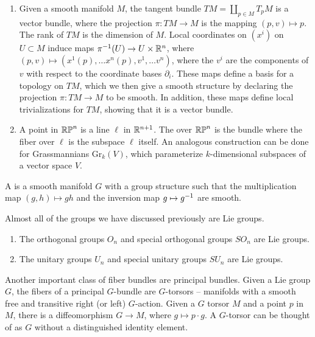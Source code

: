 \begin{exmp} \enumbreak
\begin{enumerate}
  \item Given a smooth manifold $M$, the tangent bundle $TM = \coprod_{p \in M} T_pM$
  is a vector bundle, where the projection $\pi : TM \to M$ is the mapping
  $(p,v) \mapsto p$. The rank of $TM$ is the dimension of $M$.
  Local coordinates on $(x^i)$ on $U \subset M$ induce maps
  $\pi^{-1}(U) \to U \times \mathbb{R}^n$, where
  $(p,v) \mapsto (x^1(p), \ldots x^n(p), v^1, \ldots v^n)$, where the $v^i$ are
  the components of $v$ with respect to the coordinate bases $\partial_i$.
  These maps define a basis for a topology on $TM$, which we then give
  a smooth structure by declaring the projection $\pi : TM \to M$ to be
  smooth. In addition, these maps define local trivializations for $TM$,
  showing that it is a vector bundle.
  \item A point in $\mathbb{RP}^n$ is a line $\ell$ in $\mathbb{R}^{n+1}$. The  over $\mathbb{RP}^n$ is the bundle where the fiber over $\ell$ is the subspace
  $\ell$ itself. An analogous construction can be done for Grassmannians
  $\mathrm{Gr}_k(V)$, which parameterize $k$-dimensional subspaces of
  a vector space $V$.
\qedhere\end{enumerate}
\end{exmp}
%
\begin{defn}
A  is a smooth manifold $G$ with a group structure such that the
multiplication map $(g,h) \mapsto gh$ and the inversion map $g \mapsto g^{-1}$
are smooth.
\end{defn}
%
Almost all of the groups we have discussed previously are Lie groups.
\begin{exmp} \enumbreak
\begin{enumerate}
  \item The orthogonal groups $O_n$ and special orthogonal groups $SO_n$ are Lie groups.
  \item The unitary groups $U_n$ and special unitary groups $SU_n$ are Lie groups.
\qedhere\end{enumerate}
\end{exmp}
%
Another important class of fiber bundles are principal bundles. Given a
Lie group $G$, the fibers of a principal $G$-bundle are $G$-torsors --
manifolds with a smooth free and transitive right (or left) $G$-action.
Given a $G$ torsor $M$ and a point $p$ in $M$, there is a diffeomorphism
$G \to M$, where $g \mapsto p \cdot g$. A $G$-torsor can be thought
of as $G$ without a distinguished identity element.
